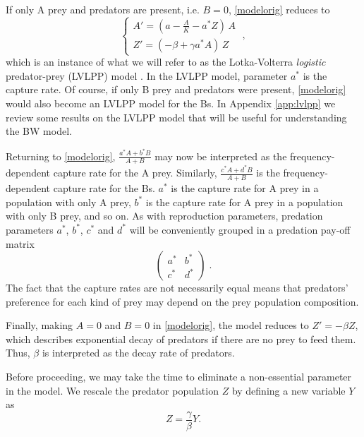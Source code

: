 \documentclass[12pt]{article}
\theoremstyle{definition}
\begin{document}
If only A prey and predators are present, i.e. $B=0$, \eqref{modelorig} reduces to 
\begin{equation} \label{modlvlpp}
	\begin{cases} 
		A' =  \left( a - \frac{A}{K} - a^* Z \right) \,A \\
		Z' = \left( -\beta + \gamma a^* A  \right) \,Z
	\end{cases}\;,
\end{equation}
which is an instance of what we will refer to as the Lotka-Volterra \emph{logistic} predator-prey (LVLPP) model \cite{hofsig}. In the LVLPP model, parameter $a^*$ is the capture rate. Of course, if only B prey and predators were present, \eqref{modelorig} would also become an LVLPP model for the Bs. In Appendix \ref{app:lvlpp} we review some results on the LVLPP model that will be useful for understanding the BW model.

Returning to \eqref{modelorig}, $\frac{a^*A + b^*B}{A + B}$ may now be interpreted as the frequency-dependent capture rate for the A prey. Similarly, $\frac{c^*A + d^*B}{A + B}$ is the frequency-dependent capture rate for the Bs. $a^*$ is the capture rate for A prey in a population with only A prey, $b^*$ is the capture rate for A prey in a population with only B prey, and so on. As with reproduction parameters, predation parameters $a^*$, $b^*$, $c^*$ and $d^*$ will be conveniently grouped in a predation pay-off matrix
\[\begin{pmatrix}
	a^* & b^* \\
	c^* & d^*
\end{pmatrix}\;.\]
The fact that the capture rates are not necessarily equal means that predators' preference for each kind of prey may depend on the prey population composition.

Finally, making $A=0$ and $B=0$ in \eqref{modelorig}, the model reduces to $Z'=-\beta Z$, which describes exponential decay of predators if there are no prey to feed them. Thus, $\beta$ is interpreted as the decay rate of predators.

Before proceeding, we may take the time to eliminate a non-essential parameter in the model. We rescale the predator population $Z$ by defining a new variable $Y$ as 
\[
Z = \frac{\gamma}{\beta} Y.
\]
\end{document}

